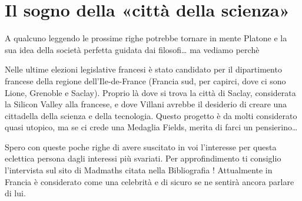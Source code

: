 \section{Il sogno della «città della scienza»}

A qualcuno leggendo le prossime righe potrebbe tornare in mente Platone e la sua idea della società perfetta guidata dai filosofi… ma vediamo perchè

Nelle ultime elezioni legislative francesi è stato candidato per il dipartimento francese della regione dell’Ile-de-France (Francia sud, per capirci, dove ci sono Lione, Grenoble e Saclay). Proprio là dove si trova la città di Saclay, considerata la Silicon Valley alla francese, e dove Villani avrebbe il desiderio di creare una cittadella della scienza e della tecnologia. Questo progetto è da molti considerato quasi utopico, ma se ci crede una Medaglia Fields, merita di farci un pensierino…

Spero con queste poche righe di avere suscitato in voi l’interesse per questa eclettica persona dagli interessi più svariati. Per approfindimento ti consiglio l'intervista sul sito di Madmaths citata nella Bibliografia \cite{url:maddmath_villani}! Attualmente in Francia è considerato come una celebrità e di sicuro se ne sentirà ancora parlare di lui.